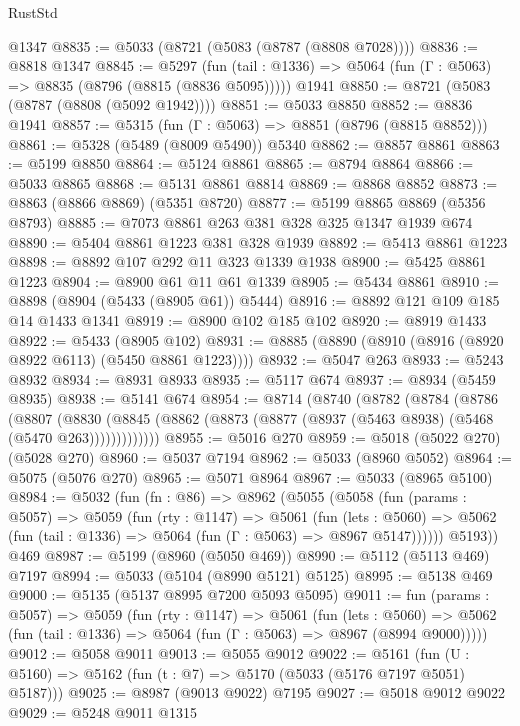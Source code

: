\begin{lexlean}{RustStd}
\begin{coremodule}
    @1347
@8835 := @5033 (@8721 (@5083 (@8787 (@8808 @7028))))
@8836 := @8818 @1347
@8845 := @5297
    (fun (tail : @1336) => @5064 (fun (Γ : @5063) => @8835 (@8796 (@8815 (@8836 @5095)))))
    @1941
@8850 := @8721 (@5083 (@8787 (@8808 (@5092 @1942))))
@8851 := @5033 @8850
@8852 := @8836 @1941
@8857 := @5315 (fun (Γ : @5063) => @8851 (@8796 (@8815 @8852)))
@8861 := @5328 (@5489 (@8009 @5490)) @5340
@8862 := @8857 @8861
@8863 := @5199 @8850
@8864 := @5124 @8861
@8865 := @8794 @8864
@8866 := @5033 @8865
@8868 := @5131 @8861 @8814
@8869 := @8868 @8852
@8873 := @8863 (@8866 @8869) (@5351 @8720)
@8877 := @5199 @8865 @8869 (@5356 @8793)
@8885 := @7073 @8861 @263 @381 @328 @325 @1347 @1939 @674
@8890 := @5404 @8861 @1223 @381 @328 @1939
@8892 := @5413 @8861 @1223
@8898 := @8892 @107 @292 @11 @323 @1339 @1938
@8900 := @5425 @8861 @1223
@8904 := @8900 @61 @11 @61 @1339
@8905 := @5434 @8861
@8910 := @8898 (@8904 (@5433 (@8905 @61)) @5444)
@8916 := @8892 @121 @109 @185 @14 @1433 @1341
@8919 := @8900 @102 @185 @102
@8920 := @8919 @1433
@8922 := @5433 (@8905 @102)
@8931 := @8885 (@8890 (@8910 (@8916 (@8920 @8922 @6113) (@5450 @8861 @1223))))
@8932 := @5047 @263
@8933 := @5243 @8932
@8934 := @8931 @8933
@8935 := @5117 @674
@8937 := @8934 (@5459 @8935)
@8938 := @5141 @674
@8954 := @8714
    (@8740
      (@8782
        (@8784
          (@8786
            (@8807
              (@8830
                (@8845 (@8862 (@8873 (@8877 (@8937 (@5463 @8938) (@5468 (@5470 @263)))))))))))))
@8955 := @5016 @270
@8959 := @5018 (@5022 @270) (@5028 @270)
@8960 := @5037 @7194
@8962 := @5033 (@8960 @5052)
@8964 := @5075 (@5076 @270)
@8965 := @5071 @8964
@8967 := @5033 (@8965 @5100)
@8984 := @5032
    (fun (fn : @86) =>
    @8962
      (@5055
        (@5058
          (fun (params : @5057) =>
          @5059
            (fun (rty : @1147) =>
            @5061
              (fun (lets : @5060) =>
              @5062 (fun (tail : @1336) => @5064 (fun (Γ : @5063) => @8967 @5147))))))
        @5193))
    @469
@8987 := @5199 (@8960 (@5050 @469))
@8990 := @5112 (@5113 @469) @7197
@8994 := @5033 (@5104 (@8990 @5121) @5125)
@8995 := @5138 @469
@9000 := @5135 (@5137 @8995 @7200 @5093 @5095)
@9011 := fun (params : @5057) =>
  @5059
    (fun (rty : @1147) =>
    @5061
      (fun (lets : @5060) =>
      @5062 (fun (tail : @1336) => @5064 (fun (Γ : @5063) => @8967 (@8994 @9000)))))
@9012 := @5058 @9011
@9013 := @5055 @9012
@9022 := @5161 (fun (U : @5160) => @5162 (fun (t : @7) => @5170 (@5033 (@5176 @7197 @5051) @5187)))
@9025 := @8987 (@9013 @9022) @7195
@9027 := @5018 @9012 @9022
@9029 := @5248 @9011 @1315

\end{coremodule}
\end{lexlean}
